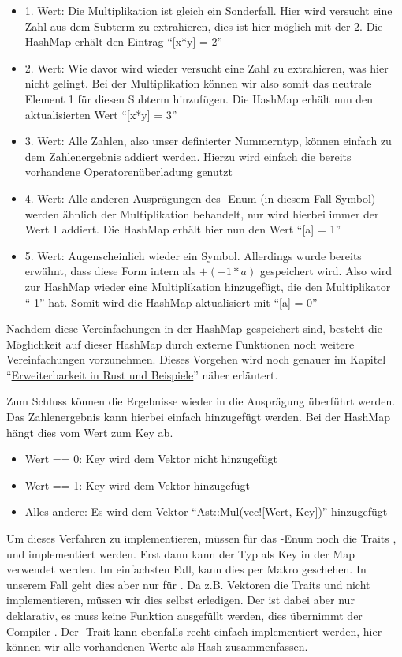 \documentclass[11pt,a4paper, ngerman]{article}
\begin{document}
\begin{itemize}
    \item 1. Wert: Die Multiplikation ist gleich ein Sonderfall. Hier wird versucht eine Zahl aus dem Subterm zu extrahieren, dies ist hier möglich mit der $2$. Die HashMap erhält den Eintrag ``[x*y] = 2''
    \item 2. Wert: Wie davor wird wieder versucht eine Zahl zu extrahieren, was hier nicht gelingt. Bei der Multiplikation können wir also somit das neutrale Element 1 für diesen Subterm hinzufügen. Die HashMap erhält nun den aktualisierten Wert ``[x*y] = 3''
    \item 3. Wert: Alle Zahlen, also unser definierter Nummerntyp, können einfach zu dem Zahlenergebnis addiert werden. Hierzu wird einfach die bereits vorhandene Operatorenüberladung genutzt
    \item 4. Wert: Alle anderen Ausprägungen des -Enum (in diesem Fall Symbol) werden ähnlich der Multiplikation behandelt, nur wird hierbei immer der Wert 1 addiert. Die HashMap erhält hier nun den Wert ``[a] = 1''
    \item 5. Wert: Augenscheinlich wieder ein Symbol. Allerdings wurde bereits erwähnt, dass diese Form intern als $+(-1*a)$ gespeichert wird. Also wird zur HashMap wieder eine Multiplikation hinzugefügt, die den Multiplikator ``-1'' hat. Somit wird die HashMap aktualisiert mit ``[a] = 0''
\end{itemize}

Nachdem diese Vereinfachungen in der HashMap gespeichert sind, besteht die Möglichkeit auf dieser HashMap durch externe Funktionen noch weitere Vereinfachungen vorzunehmen. Dieses Vorgehen wird noch genauer im Kapitel ``\hyperref[sec:kapErRustUndBei]{Erweiterbarkeit in Rust und Beispiele}'' näher erläutert.

Zum Schluss können die Ergebnisse wieder in die Ausprägung  überführt werden. Das Zahlenergebnis kann hierbei einfach hinzugefügt werden. Bei der HashMap hängt dies vom Wert zum Key ab. 

\begin{itemize}
    \item Wert == 0: Key wird dem Vektor nicht hinzugefügt
    \item Wert == 1: Key wird dem Vektor hinzugefügt
    \item Alles andere: Es wird dem Vektor ``Ast::Mul(vec![Wert, Key])'' hinzugefügt
\end{itemize}

Um dieses Verfahren zu implementieren, müssen für das -Enum noch die Traits ,  und  implementiert werden. Erst dann kann der Typ  als Key in der Map verwendet werden. Im einfachsten Fall, kann dies per Makro geschehen. In unserem Fall geht dies aber nur für . Da z.B. Vektoren die Traits  und  nicht implementieren, müssen wir dies selbst erledigen. Der  ist dabei aber nur deklarativ, es muss keine Funktion ausgefüllt werden, dies übernimmt der Compiler \cite{RustEqTrait}. Der -Trait kann ebenfalls recht einfach implementiert werden, hier können wir alle vorhandenen Werte als Hash zusammenfassen.
\end{document}

